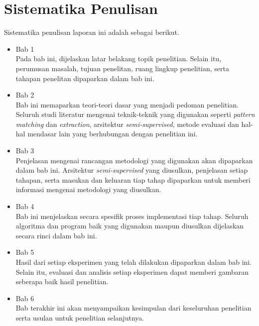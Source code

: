 \section{Sistematika Penulisan}
Sistematika penulisan laporan ini adalah sebagai berikut.
\begin{itemize}
	\item Bab 1 \babSatu \\
	Pada bab ini, dijelaskan latar belakang topik penelitian. Selain itu, perumusan masalah, tujuan penelitan, ruang lingkup penelitian, serta tahapan penelitan dipaparkan dalam bab ini.
	\item Bab 2 \babDua \\
	Bab ini memaparkan teori-teori dasar yang menjadi pedoman penelitian. Seluruh studi literatur mengenai teknik-teknik yang digunakan seperti \textit{pattern matching} dan \textit{extraction}, arsitektur \textit{semi-supervised}, metode evaluasi dan hal-hal mendasar lain yang berhubungan dengan penelitian ini.
	\item Bab 3 \babTiga \\
	Penjelasan mengenai rancangan metodologi yang digunakan akan dipaparkan dalam bab ini. Arsitektur \textit{semi-supervised} yang diusulkan, penjelasan setiap tahapan, serta masukan dan keluaran tiap tahap dipaparkan untuk memberi informasi mengenai metodologi yang diusulkan.
	\item Bab 4 \babEmpat \\
	Bab ini menjelaskan secara spesifik proses implementasi tiap tahap. Seluruh algoritma dan program baik yang digunakan maupun diusulkan dijelaskan secara rinci dalam bab ini.
	\item Bab 5 \babLima \\
	Hasil dari setiap eksperimen yang telah dilakukan dipaparkan dalam bab ini. Selain itu, evaluasi dan analisis setiap eksperimen dapat memberi gambaran seberapa baik hasil penelitian.
	\item Bab 6 \babEnam \\
	Bab terakhir ini akan menyampaikan kesimpulan dari keseluruhan penelitian serta usulan untuk penelitian selanjutnya.
\end{itemize}

